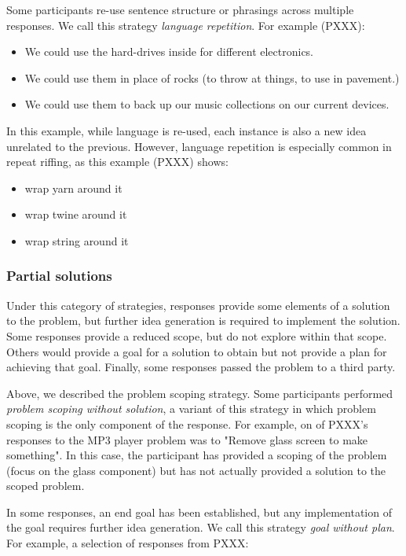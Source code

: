 Some participants re-use sentence structure or phrasings across multiple responses. We call this strategy \emph{language repetition}. For example (PXXX):

\begin{itemize}
    \item We could use the hard-drives inside for different electronics.
    \item We could use them in place of rocks (to throw at things, to use in pavement.)
    \item We could use them to back up our music collections on our current devices.
\end{itemize}

In this example, while language is re-used, each instance is also a new idea unrelated to the previous.
However, language repetition is especially common in repeat riffing, as this example (PXXX) shows:

\begin{itemize}
    \item wrap yarn around it
    \item wrap twine around it
    \item wrap string around it
\end{itemize}

\subsubsection{Partial solutions}

Under this category of strategies, responses provide some elements of a solution to the problem, but further idea generation is required to implement the solution. Some responses provide a reduced scope, but do not explore within that scope. Others would provide a goal for a solution to obtain but not provide a plan for achieving that goal. Finally, some responses passed the problem to a third party.

Above, we described the problem scoping strategy. Some participants performed \emph{problem scoping without solution}, a variant of this strategy in which problem scoping is the only component of the response.
For example, on of PXXX's responses to the MP3 player problem was to "Remove glass screen to make something". In this case, the participant has provided a scoping of the problem (focus on the glass component) but has not actually provided a solution to the scoped problem.

In some responses, an end goal has been established, but any implementation of the goal requires further idea generation. We call this strategy \emph{goal without plan}. For example, a selection of responses from PXXX:

